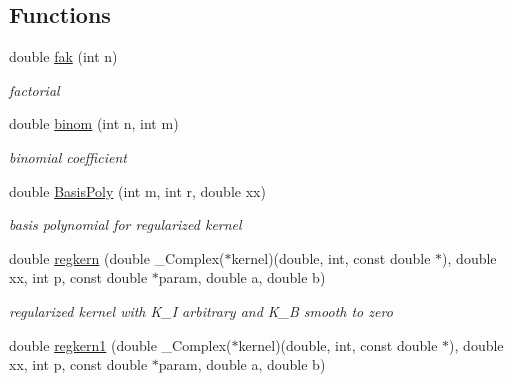 \subsection*{Functions}
\begin{CompactItemize}
\item 
\hypertarget{group__applications__fastsum_g6fd3e84b794684dd1c6236619437bf09}{
double \hyperlink{group__applications__fastsum_g6fd3e84b794684dd1c6236619437bf09}{fak} (int n)}
\label{group__applications__fastsum_g6fd3e84b794684dd1c6236619437bf09}

\begin{CompactList}\small\item\em factorial \item\end{CompactList}\item 
\hypertarget{group__applications__fastsum_ge767db8af0cbe9244cfbd0580b0bb9f4}{
double \hyperlink{group__applications__fastsum_ge767db8af0cbe9244cfbd0580b0bb9f4}{binom} (int n, int m)}
\label{group__applications__fastsum_ge767db8af0cbe9244cfbd0580b0bb9f4}

\begin{CompactList}\small\item\em binomial coefficient \item\end{CompactList}\item 
\hypertarget{group__applications__fastsum_g0c4b940daf11ebe201355f43f26cddd0}{
double \hyperlink{group__applications__fastsum_g0c4b940daf11ebe201355f43f26cddd0}{BasisPoly} (int m, int r, double xx)}
\label{group__applications__fastsum_g0c4b940daf11ebe201355f43f26cddd0}

\begin{CompactList}\small\item\em basis polynomial for regularized kernel \item\end{CompactList}\item 
\hypertarget{group__applications__fastsum_g42189eaf1638274b8080ef9ad2c9bd26}{
double \hyperlink{group__applications__fastsum_g42189eaf1638274b8080ef9ad2c9bd26}{regkern} (double \_\-Complex($\ast$kernel)(double, int, const double $\ast$), double xx, int p, const double $\ast$param, double a, double b)}
\label{group__applications__fastsum_g42189eaf1638274b8080ef9ad2c9bd26}

\begin{CompactList}\small\item\em regularized kernel with K\_\-I arbitrary and K\_\-B smooth to zero \item\end{CompactList}\item 
\hypertarget{group__applications__fastsum_g94158e815aa82c0e38d79329d8969216}{
double \hyperlink{group__applications__fastsum_g94158e815aa82c0e38d79329d8969216}{regkern1} (double \_\-Complex($\ast$kernel)(double, int, const double $\ast$), double xx, int p, const double $\ast$param, double a, double b)}
\label{group__applications__fastsum_g94158e815aa82c0e38d79329d8969216}


\end{CompactItemize}
